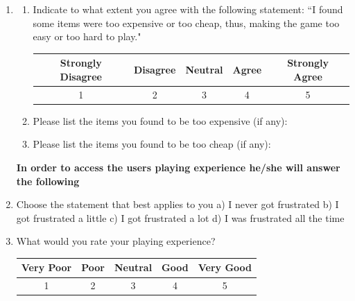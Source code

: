 \documentclass[msc,oneside]{ubcthesis}%
\begin{document}
\begin{enumerate}
      \item 

      \begin{enumerate}
        \item Indicate to what extent you agree with the following statement: ``I found some items were too expensive or too cheap, thus, making the game too easy or too hard to play."
        \bigskip
        \begin{table}[tbph]
          \centering        
          \label{table:price}
          \begin{tabular}{|c|c|c|c|c|}
            \hline
            Strongly Disagree & Disagree & Neutral & Agree & Strongly Agree \\ \hline
            1 & 2 & 3 & 4 & 5 \\ \hline
          \end{tabular}
        \end{table}
        
        \item Please list the items you found to be too expensive (if any):

        \item Please list the items you found to be too cheap  (if any):
      \end{enumerate}

      \bigskip
      \textbf{In order to access the users playing experience he/she will answer the following}

      \item Choose the statement that best applies to you \newline
          a) I never got frustrated \newline
          b) I got frustrated a little \newline
          c) I got frustrated a lot \newline
          d) I was frustrated all the time 
\newpage
      \item What would you rate your playing experience?
      \begin{table}[tbph]
        \centering        
        \label{table:experience}          
          \begin{tabular}{|c|c|c|c|c|}
          \hline
          Very Poor & Poor & Neutral & Good & Very Good \\ \hline
          1 & 2 & 3 & 4 & 5 \\ \hline
          \end{tabular}
      \end{table}


\end{enumerate}
\end{document}
